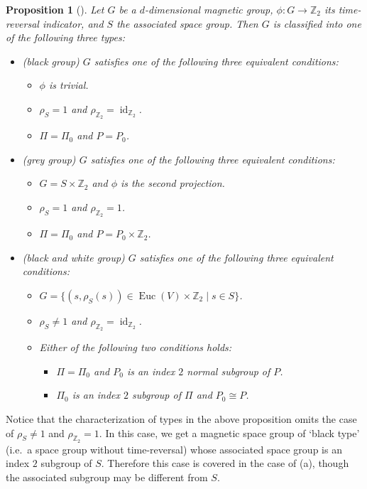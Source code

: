 \documentclass[11pt]{amsart}
\theoremstyle{definition}
\theoremstyle{plain}
\newtheorem{prp}[equation]{Proposition}
\theoremstyle{remark}
\DeclareMathOperator{\id}{id}
\newcommand{\bZ}{\mathbb{Z}}
\DeclareMathOperator{\Euc}{Euc}
\begin{document}
\begin{prp}[{\cite{schwarzenbergerColourSymmetry1984}}] \label{prop:relation_to_standard_formulation}
Let $G$ be a $d$-dimensional magnetic group, $\phi \colon G \to \bZ_2$ its time-reversal indicator, and $S$ the associated space group. Then $G$ is classified into one of the following three types:
\begin{itemize}
\item[(a)] (black group) $G$ satisfies one of the following three equivalent conditions:
\begin{itemize}
\item[(a1)] $\phi$ is trivial.
\item[(a2)] $\rho_S=1$ and $\rho_{\bZ_2} =\id_{\bZ_2}$.
\item[(a3)] $\Pi = \Pi_0 $ and $P=P_0$.
\end{itemize}
\item[(b)] (grey group) $G$ satisfies one of the following three equivalent conditions:
\begin{itemize}
\item[(b1)]$G = S \times \bZ_2$ and $\phi$ is the second projection.
\item[(b2)] $\rho_S=1$ and $\rho_{\bZ_2} = 1$.
\item[(b3)] $\Pi = \Pi_0 $ and $P=P_0 \times \bZ_2$.
\end{itemize}
\item[(c)] (black and white group) $G$ satisfies one of the following three equivalent conditions:
\begin{itemize}
\item[(c1)] $G=\{ (s , \rho_S(s)) \in \Euc(V) \times \bZ_2 \mid s \in S \}$. 
\item[(c2)] $\rho_S \neq 1$ and $\rho_{\bZ_2} =\id_{\bZ_2}$.
\item[(c3)] Either of the following two conditions holds:
\begin{itemize}
\item[(c-i)] $\Pi=\Pi_0$ and $P_0$ is an index $2$ normal subgroup of $P$.
\item[(c-ii)] $\Pi_0$ is an index $2$ subgroup of $\Pi$ and $P_0 \cong P$.
\end{itemize}
\end{itemize}
\end{itemize}
\end{prp}
Notice that the characterization of types in the above proposition omits the case of $\rho_{S} \neq 1$ and $\rho_{\bZ_2} = 1$. 
In this case, we get a magnetic space group of `black type' (i.e.\ a space group without time-reversal) whose associated space group is an index $2$ subgroup of $S$. 
Therefore this case is covered in the case of (a), though the associated subgroup may be different from $S$.
\end{document}
